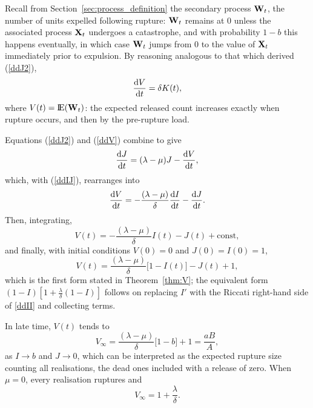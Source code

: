 Recall from Section~\ref{sec:process_definition} the secondary process ${{\bf W}_t}$,
the number of units expelled following rupture: ${{\bf W}_t}$ remains at $0$ unless the
associated process ${{\bf X}_t}$ undergoes a catastrophe, and with probability $1-b$
this happens eventually, in which case ${{\bf W}_t}$ jumps from $0$ to the value of
${{\bf X}_t}$ immediately prior to expulsion. By reasoning analogous to that which
derived (\ref{ddJ2}),
\begin{equation}
\label{ddV}
\displaystyle\frac{{\rm d} V}{{\rm d} t} = \delta K(t),
\end{equation}
where $V(t) = {\rm I}\!{\rm E}({{\bf W}_t})$: the expected released count increases exactly when
rupture occurs, and then by the pre-rupture load.

Equations (\ref{ddJ2}) and (\ref{ddV}) combine to give
$$\displaystyle\frac{{\rm d} J}{{\rm d} t} = (\lambda - \mu) J - \displaystyle\frac{{\rm d} V}{{\rm d} t},$$
which, with (\ref{ddIJ}), rearranges into
$$\displaystyle\frac{{\rm d} V}{{\rm d} t} = -\frac{(\lambda - \mu)}{\delta}\displaystyle\frac{{\rm d} I}{{\rm d} t} - \displaystyle\frac{{\rm d} J}{{\rm d} t}.$$
Then, integrating,
$$V(t) = -\frac{(\lambda - \mu)}{\delta}I(t) - J(t) + \text{const},$$
and finally, with initial conditions $V(0) = 0$ and $J(0)=I(0)=1$,
\begin{equation}
\label{Voft}
V(t) = \frac{(\lambda - \mu)}{\delta}\big[1-I(t)\big] -J(t)+1,
\end{equation}
which is the first form stated in Theorem~\ref{thm:V}; the equivalent form
$(1-I)[1+\frac{\lambda}{\delta}(1-I)]$ follows on replacing $I'$ with the
Riccati right-hand side of \eqref{ddII} and collecting terms.

In late time, $V(t)$ tends to
$$V_{\infty} = \frac{(\lambda - \mu)}{\delta}\big[1-b\big] +1 = \frac{aB}{A},$$
as $I\to b$ and $J\to0$, which can be interpreted as the expected rupture size
counting all realisations, the dead ones included with a release of zero. When
$\mu = 0$, every realisation ruptures and
$$V_\infty = 1 +\frac{\lambda}{\delta}.$$
